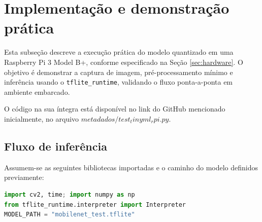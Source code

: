 \documentclass[repeatfields,xlists,xpacks,oneside]{ufrgscca}
\begin{document}
\section{Implementação e demonstração prática}
\label{sec:implementacao}
Esta subseção descreve a execução prática do modelo quantizado em uma Raspberry Pi 3 Model B+, conforme especificado na Seção \ref{sec:hardware}. O objetivo é demonstrar a captura de imagem, pré-processamento mínimo e inferência usando o \texttt{tflite\_runtime}, validando o fluxo ponta-a-ponta em ambiente embarcado.

O código na sua íntegra está disponível no link do GitHub mencionado inicialmente, no arquivo \texttt{$metadados/test_tinyml_rpi.py$}.

\subsection{Fluxo de inferência}
Assumem-se as seguintes bibliotecas importadas e o caminho do modelo definidos previamente:
\begin{lstlisting}[language=Python]
import cv2, time; import numpy as np
from tflite_runtime.interpreter import Interpreter
MODEL_PATH = "mobilenet_test.tflite"
\end{lstlisting}
\end{document}
